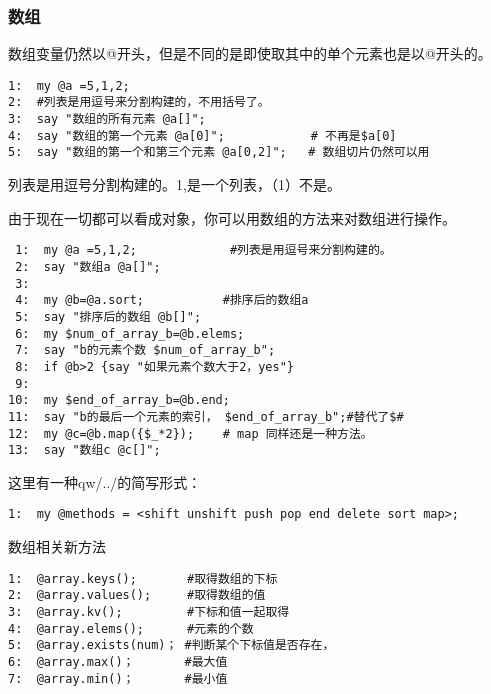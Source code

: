 \documentclass{ctexart}
\begin{document}
\subsubsection{数组}
\label{sec-4-1-2}

数组变量仍然以@开头，但是不同的是即使取其中的单个元素也是以@开头的。

\begin{lstlisting}
1:  my @a =5,1,2;                         
2:  #列表是用逗号来分割构建的，不用括号了。
3:  say "数组的所有元素 @a[]";
4:  say "数组的第一个元素 @a[0]";            # 不再是$a[0]
5:  say "数组的第一个和第三个元素 @a[0,2]";   # 数组切片仍然可以用
\end{lstlisting}
列表是用逗号分割构建的。1,是一个列表，（1）不是。

由于现在一切都可以看成对象，你可以用数组的方法来对数组进行操作。

\begin{lstlisting}
 1:  my @a =5,1,2;             #列表是用逗号来分割构建的。
 2:  say "数组a @a[]";
 3:  
 4:  my @b=@a.sort;           #排序后的数组a
 5:  say "排序后的数组 @b[]";
 6:  my $num_of_array_b=@b.elems;
 7:  say "b的元素个数 $num_of_array_b";
 8:  if @b>2 {say "如果元素个数大于2，yes"}
 9:  
10:  my $end_of_array_b=@b.end;
11:  say "b的最后一个元素的索引， $end_of_array_b";#替代了$#
12:  my @c=@b.map({$_*2});    # map 同样还是一种方法。
13:  say "数组c @c[]";
\end{lstlisting}
这里有一种qw/../的简写形式：

\begin{lstlisting}
1:  my @methods = <shift unshift push pop end delete sort map>;
\end{lstlisting}
数组相关新方法

\begin{lstlisting}
1:  @array.keys();       #取得数组的下标
2:  @array.values();     #取得数组的值
3:  @array.kv();         #下标和值一起取得
4:  @array.elems();      #元素的个数
5:  @array.exists(num)； #判断某个下标值是否存在，
6:  @array.max()；       #最大值
7:  @array.min()；       #最小值
\end{lstlisting}
\end{document}
